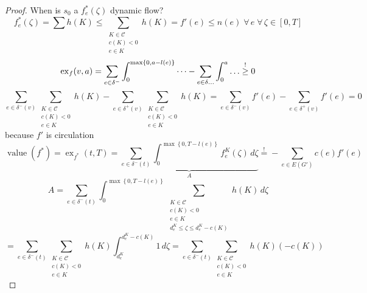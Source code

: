 \documentclass[a4paper]{article}
\theoremstyle{definition}
\newcommand{\set}[1]{\left\{#1\right\}}
\newcommand{\fall}{\;\forall\,}
\begin{document}
\begin{proof}
  When is $s_0$ a $f_e^*(\zeta)$ dynamic flow?
  \begin{equation}
    f_e^*(\zeta) = \sum h(K) \leq \sum_{\substack{K \in \mathcal{C} \\ c(K) < 0 \\ e \in K}} h(K) = f'(e) \leq n(e) \fall e \fall \zeta \in [0, T]
  \end{equation} \begin{equation}
    \operatorname{ex}_f(v, a) = \sum_{e \in \delta^-} \int_0^{\max\set{0, a-l(e)}} \dots
      - \sum_{e \in \delta\dots} \int_0^a \dots \stackrel{!}{\geq} 0 \\
  \end{equation} \begin{equation*}
    \sum_{e \in \delta^-(v)} \sum_{\substack{K \in \mathcal{C} \\ c(K) < 0 \\ e \in K}} h(K)
      - \sum_{e \in \delta^+(v)} \sum_{\substack{K \in \mathcal{C} \\ c(K) < 0 \\ e \in K}} h(K)
      = \sum_{e \in \delta^-(v)} f'(e) - \sum_{e \in \delta^+(v)} f'(e) = 0
  \end{equation*}
  because $f'$ is circulation
  \begin{equation*}
    \operatorname{value}(f^*)
      = \operatorname{ex}_{f^*}(t, T)
      = \underbrace{\sum_{e \in \delta^-(t)} \int_0^{\max\set{0, T - l(e)}} f_e^K(\zeta) \,d\zeta}_{A}
      \stackrel{!}{=} -\sum_{e \in E(G')} c(e) f'(e)
  \end{equation*}
  \begin{equation*}
    A = \sum_{e \in \delta^-(t)} \int_0^{\max\set{0, T - l(e)}}
      \sum_{\substack{K \in \mathcal{C} \\ c(K) < 0 \\ e \in K \\ d_e^K \leq \zeta \leq d_e^K - c(K)}}
      h(K) \,  d\zeta
  \end{equation*} \begin{equation*}
      = \sum_{e \in \delta^-(t)} \sum_{\substack{K \in \mathcal{C} \\ c(K) < 0 \\ e \in K}} h(K) \int_{d_e^K}^{d_e^K -c(K)} 1 \,d\zeta
      = \sum_{e \in \delta^-(t)} \sum_{\substack{K \in \mathcal{C} \\ c(K) < 0 \\ e \in K}} h(K) (-c(K))
  \end{equation*} \begin{equation*}

\end{equation*}
\end{proof}
\end{document}
